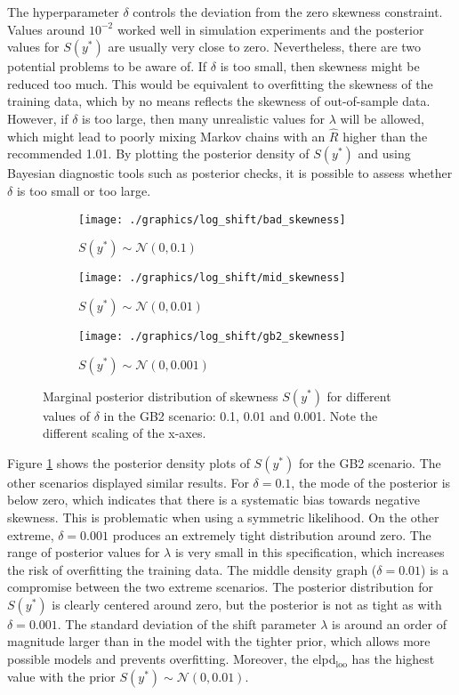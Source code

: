 The hyperparameter $\delta$ controls the deviation from the zero skewness constraint.
Values around $10^{-2}$ worked well in simulation experiments and the posterior values for $S(y^*)$ are usually very close to zero.
Nevertheless, there are two potential problems to be aware of.
If $\delta$ is too small, then skewness might be reduced too much.
This would be equivalent to overfitting the skewness of the training data, which by no means reflects the skewness of out-of-sample data.
However, if $\delta$ is too large, then many unrealistic values for $\lambda$ will be allowed, which might lead to poorly mixing Markov chains with an $\hat R$ higher than the recommended 1.01.
By plotting the posterior density of $S(y^*)$ and using Bayesian diagnostic tools such as posterior checks, it is possible to assess whether $\delta$ is too small or too large.


\begin{figure}[t]
    \centering
    \begin{subfigure}{0.32\linewidth}
        \texttt{[image: ./graphics/log\_shift/bad\_skewness]}
        \caption{$S(y^*) \sim \mathcal N (0, 0.1)$}
    \end{subfigure}
    \begin{subfigure}{0.32\linewidth}
        \texttt{[image: ./graphics/log\_shift/mid\_skewness]}
        \caption{$S(y^*) \sim \mathcal N (0, 0.01)$}
    \end{subfigure}
    \begin{subfigure}{0.32\linewidth}
        \texttt{[image: ./graphics/log\_shift/gb2\_skewness]}
        \caption{$S(y^*) \sim \mathcal N (0, 0.001)$}
    \end{subfigure}

    \caption[Marginal posterior distribution of skewness for different values of $\delta$.]{Marginal posterior distribution of skewness $S(y^*)$ for different values of $\delta$ in the GB2 scenario: 0.1, 0.01 and 0.001. Note the different scaling of the x-axes.}
    \label{fig:bad_skewness}
\end{figure}

Figure \ref{fig:bad_skewness} shows the posterior density plots of $S(y^*)$ for the GB2 scenario.
The other scenarios displayed similar results.
For $\delta = 0.1$, the mode of the posterior is below zero, which indicates that there is a systematic bias towards negative skewness.
This is problematic when using a symmetric likelihood.
On the other extreme, $\delta = 0.001$ produces an extremely tight distribution around zero.
The range of posterior values for $\lambda$ is very small in this specification, which increases the risk of overfitting the training data.
The middle density graph ($\delta = 0.01$) is a compromise between the two extreme scenarios.
The posterior distribution for $S(y^*)$ is clearly centered around zero, but the posterior is not as tight as with $\delta = 0.001$.
The standard deviation of the shift parameter $\lambda$ is around an order of magnitude larger than in the model with the tighter prior, which allows more possible models and prevents overfitting.
Moreover, the elpd$_{\text{loo}}$ has the highest value with the prior $S(y^*) \sim \mathcal N(0, 0.01)$.



